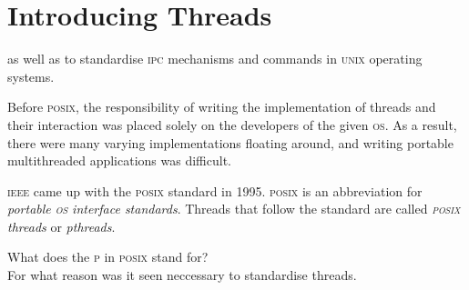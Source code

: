 \section{Introducing Threads}

as well as to standardise \textsc{ipc} mechanisms and commands 
in \textsc{unix} operating systems.

Before \textsc{posix}, the responsibility of writing the
implementation of threads and their interaction was placed 
solely on the developers of the given \textsc{os}. 
As a result, there were many varying implementations floating around, 
and writing portable multithreaded applications was difficult.

\textsc{ieee} came up with the \textsc{posix} standard in 1995. 
\textsc{posix} is an abbreviation for 
\textit{portable \textsc{os} interface standards}.
Threads that follow the standard are called 
\textit{\textsc{posix} threads} or \textit{pthreads}.

\begin{example}
What does the \textsc{p} in \textsc{posix} stand for? \\
For what reason was it seen neccessary to standardise threads.
\end{example}